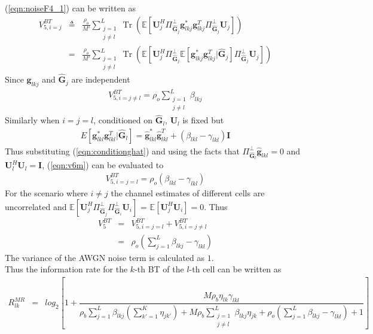 \documentclass[10pt, a4paper, twoside,fleqn]{article}
\DeclareMathOperator{\Tr}{Tr}
\begin{document}
(\ref{eqn:noiseF4_1}) can be written as 
\begin{eqnarray}\label{eqn:v6m}
V_{5,i=j}^{BT}&\triangleq& \frac{\rho_o}{M'}\sum\limits_{\substack{j=1 \\ j \neq l}}^{L} \Tr\left(\mathbb{E}\left[\pmb{U}_j^H \Pi^{\perp}_{\pmb{\hat{G}}_j} \pmb{g}_{lkj}^* \pmb{g}_{lkj}^{T}\Pi^{\perp}_{\pmb{\hat G}_j} \pmb{U}_j \right]\right) \nonumber \\
           &=& \frac{\rho_o}{M'}\sum_{\substack{j=1 \\ j \neq l}}^{L}\Tr\left(\mathbb{E}\left[\pmb{U}_j^H \Pi^{\perp}_{\pmb{\hat{G}}_j} \mathbb{E}[\pmb{g}_{lkj}^* \pmb{g}_{lkj}^{T} | \pmb{\hat G}_j]\Pi^{\perp}_{\pmb{\hat G}_j} \pmb{U}_j \right]\right)
\end{eqnarray}
Since $\pmb{g}_{lkj}$ and $\pmb{\hat G}_j$ are independent
\begin{eqnarray}\label{eqn:v6neql}
V_{5,i=j\neq l}^{BT} = \rho_o\sum\limits_{\substack{j=1 \\ j \neq l}}^{L}\beta_{lkj}
\end{eqnarray}
Similarly when $i=j=l$, conditioned on $\pmb{\hat G}_l$, $\pmb{U}_l$ is fixed but
\begin{eqnarray}\label{eqn:conditionghat}
E[\pmb{g}_{lkl}^*\pmb{g}_{lkl}^T|\pmb{\hat G}_l] = \pmb{\hat g}_{lkl}^*\pmb{\hat g}_{lkl}^T + (\beta_{lkl}-\gamma_{lkl})\pmb{I}
\end{eqnarray}
Thus substituting (\ref{eqn:conditionghat}) and using the facts that $\Pi^{\perp}_{\pmb{\hat G}_l}\pmb{\hat g}_{lkl} = 0$ and $\pmb{U}_l^H\pmb{U}_l=\pmb{I}$, (\ref{eqn:v6m}) can be evaluated to 
\begin{eqnarray}\label{eqn:v6l}
V_{5,i=j=l}^{BT}= \rho_o(\beta_{lkl} -\gamma_{lkl})
\end{eqnarray}
For the scenario where $i\neq j$ the channel estimates of different cells are uncorrelated and $\mathbb{E}\left[\pmb{U}_j^H\Pi^{\perp}_{\pmb{\hat{G}}_j}\Pi^{\perp}_{\pmb{\hat{G}}_i} \pmb{U}_i\right]$ = $\mathbb{E}[\pmb{U}_j^H\pmb{U}_i] =0$. Thus
\begin{eqnarray}\label{eqn:v6}
   V_5^{BT} &=& V_{5,i=j=l}^{BT} + V_{5,i=j\neq l}^{BT} \nonumber \\ &=&\rho_o\left(\sum\limits_{j=1}^{L}\beta_{lkj}-\gamma_{lkl}\right)
\end{eqnarray}
The variance of the AWGN noise term is calculated as $1$.\\
Thus the information rate for the $k$-th BT of the $l$-th cell can be written as
\begin{eqnarray}\label{eqn:rateotwitheta}
R_{lk}^{MR} &=& log_2\left[1+\dfrac{M\rho_b\eta_{lk}\gamma_{lkl}}{ \rho_b\sum\limits_{j=1}^{L}\beta_{lkj}\left(\sum\limits_{k'=1}^K\eta_{jk'}\right) +M\rho_b\sum\limits_{\substack{j=1 \\ j \neq l}}^{L}\beta_{lkj}\eta_{jk} +\rho_o\left(\sum\limits_{j=1}^{L}\beta_{lkj} -\gamma_{lkl}\right)+1}\right]
\end{eqnarray}
\end{document}
